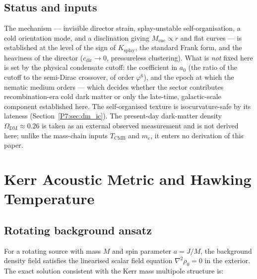 \documentclass[11pt,a4paper]{article}
\theoremstyle{definition}
\theoremstyle{remark}
\newcommand{\vp}{\varphi}
\newcommand{\TCMB}{T_{\mathrm{CMB}}}
\begin{document}
\subsection{Status and inputs}
\label{P7:sec:dm_status}

The mechanism --- invisible director strain, splay-unstable
self-organisation, a cold orientation mode, and a disclination giving
$M_{\mathrm{enc}}\propto r$ and flat curves --- is established at the level
of the sign of $K_{\mathrm{splay}}$, the standard Frank form, and the
heaviness of the director ($c_{\mathrm{dir}}\to0$, pressureless
clustering).  What is \emph{not} fixed here is set by the physical
condensate cutoff: the coefficient in $a_0$ (the ratio of the cutoff to
the semi-Dirac crossover, of order $\vp^6$), and the epoch at which the
nematic medium orders --- which decides whether the sector contributes
recombination-era cold dark matter or only the late-time, galactic-scale
component established here.  The self-organised texture is
isocurvature-safe by its lateness (Section~\ref{P7:sec:dm_ic}).  The
present-day dark-matter density $\Omega_{\mathrm{DM}}\approx0.26$ is taken
as an external observed measurement and is not derived here; unlike the
mass-chain inputs $\TCMB$ and $m_e$, it enters no derivation of this paper.

\section{Kerr Acoustic Metric and Hawking Temperature}
\label{P7:sec:kerr}

\subsection{Rotating background ansatz}

For a rotating source with mass $M$ and spin parameter $a=J/M$,
the background density field satisfies the linearised scalar field
equation $\nabla^2\rho_0 = 0$ in the exterior.
The exact solution consistent with the Kerr mass multipole structure is:
\end{document}
